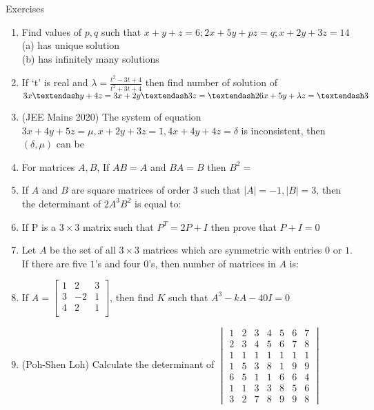 \begin{xcb}{Exercises}
\begin{enumerate}
\item Find values of $p,q$ such that $x + y + z = 6; 2x + 5y + pz = q; x + 2y + 3z = 14$\\
(a) has unique solution\\
(b) has infinitely many solutions
\item If ‘t’ is real and $\lambda = \frac{t^2-3t+4}{t^2+3t+4}$ then find number of solution of
$3x – y + 4z = 3\\
x + 2y – 3z = – 2\\
6x + 5y + \lambda z = – 3$ 
\item (JEE Mains 2020) The system of equation $3x + 4y + 5z = \mu, x + 2y + 3z = 1,
4x + 4y + 4z = \delta$ is inconsistent, then $(\delta, \mu)$ can be 
\item For matrices $A,B$, If $AB = A$ and $BA = B$ then $B^2=$\\
\item If $A$ and $B$ are square matrices of order $3$ such that $|A| = -1, |B| = 3$, then the determinant of $2A^3B^2$ is equal to:
\item If P is a $3\times3$ matrix such that $P^T = 2P + I$ then prove that $P + I = 0$
\item Let $A$ be the set of all $3 \times 3$ matrices which are symmetric with entries $0$ or $1$. If there are five $1$’s and
four $0$’s, then number of matrices in $A$ is:\\
\item If $A= \begin{bmatrix}
    1 & 2 & 3\\
    3 & -2 & 1\\
    4 & 2 & 1\\
\end{bmatrix}$, then find $K$ such that $A^3-kA-40I=0$
\item (Poh-Shen Loh) Calculate the determinant of $\begin{vmatrix}
    1 & 2& 3& 4& 5& 6& 7\\
    2 & 3& 4& 5& 6& 7& 8\\
    1 & 1& 1& 1& 1& 1& 1\\
    1 &5 &3 &8 &1 &9 &9\\6 &5 &1 &1 &6 &6 &4\\1 &1 &3 &3 &8 &5 &6\\3 &2 &7 &8 &9 &9 &8
\end{vmatrix}$
\end{enumerate}
\end{xcb}
